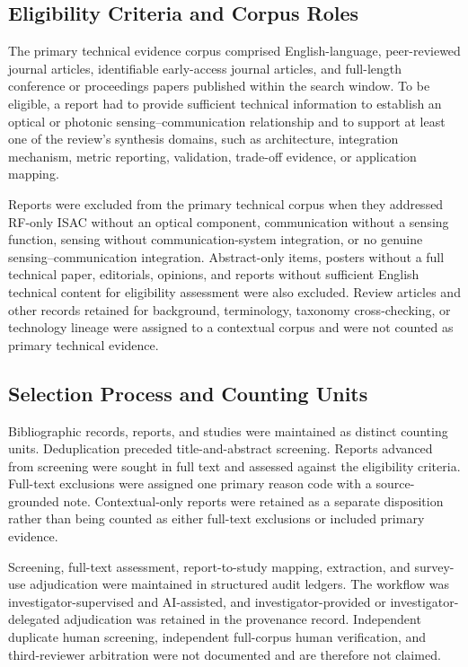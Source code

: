 \subsection{Eligibility Criteria and Corpus Roles}

The primary technical evidence corpus comprised English-language,
peer-reviewed journal articles, identifiable early-access journal articles,
and full-length conference or proceedings papers published within the search
window. To be eligible, a report had to provide sufficient technical
information to establish an optical or photonic sensing--communication
relationship and to support at least one of the review's synthesis domains,
such as architecture, integration mechanism, metric reporting, validation,
trade-off evidence, or application mapping.

Reports were excluded from the primary technical corpus when they addressed
RF-only ISAC without an optical component, communication without a sensing
function, sensing without communication-system integration, or no genuine
sensing--communication integration. Abstract-only items, posters without a
full technical paper, editorials, opinions, and reports without sufficient
English technical content for eligibility assessment were also excluded.
Review articles and other records retained for background, terminology,
taxonomy cross-checking, or technology lineage were assigned to a contextual
corpus and were not counted as primary technical evidence.

\subsection{Selection Process and Counting Units}

Bibliographic records, reports, and studies were maintained as distinct
counting units. Deduplication preceded title-and-abstract screening. Reports
advanced from screening were sought in full text and assessed against the
eligibility criteria. Full-text exclusions were assigned one primary reason
code with a source-grounded note. Contextual-only reports were retained as a
separate disposition rather than being counted as either full-text exclusions
or included primary evidence.

Screening, full-text assessment, report-to-study mapping, extraction, and
survey-use adjudication were maintained in structured audit ledgers. The
workflow was investigator-supervised and AI-assisted, and investigator-provided
or investigator-delegated adjudication was retained in the provenance record.
Independent duplicate human screening, independent full-corpus human verification, and
third-reviewer arbitration were not documented and are therefore not claimed.


